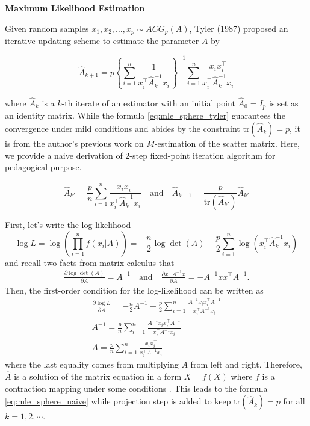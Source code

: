 \documentclass[fontsize=12pt]{article}
\begin{document}
\noindent\textbf{Maximum Likelihood Estimation}

Given random samples $x_1,x_2,\ldots,x_p \sim ACG_p(A)$, Tyler (1987) proposed an iterative updating scheme to estimate the parameter $A$ by
\begin{mdframed}
\begin{equation}\label{eq:mle_sphere_tyler}
	\hat{A}_{k+1} = p \left\lbrace
	\sum_{i=1}^{n} \frac{1}{x_i^\top \hat{A}_{k}^{-1} x_i}
	\right\rbrace^{-1} \sum_{i=1}^n \frac{x_i x_i^\top}{x_i^\top \hat{A}_{k}^{-1} x_i}
\end{equation}
\end{mdframed}
where $\hat{A}_k$ is a $k$-th iterate of an estimator with an initial point $\hat{A}_0 = I_{p}$ is set as an identity matrix. While the formula \eqref{eq:mle_sphere_tyler} guarantees the convergence under mild conditions and abides by the constraint $\text{tr}(\hat{A}_k) = p$, it is from the author's previous work on $M$-estimation of the scatter matrix. Here, we provide a naive derivation of 2-step fixed-point iteration algorithm for pedagogical purpose. 

\begin{mdframed}
	\begin{equation}\label{eq:mle_sphere_naive}
		\hat{A}_{k'} = \frac{p}{n} \sum_{i=1}^n \frac{x_i x_i^\top}{x_i^\top \hat{A}_{k}^{-1} x_i} \quad \text{and}\quad \hat{A}_{k+1} =  \frac{p}{\text{tr}(\hat{A}_{k'})} \hat{A}_{k'}
	\end{equation}
\end{mdframed}

\noindent First, let's write the log-likelihood
\begin{equation*}
	\log L = \log \left(\prod_{i=1}^{n} f(x_i\vert A)\right) = -\frac{n}{2} \log\det(A) - \frac{p}{2} \sum_{i=1}^n \log (x_i^\top \hat{A}_{k}^{-1} x_i)
\end{equation*}
and recall two facts from matrix calculus \cite{cookbook} that
\begin{gather*}
	\frac{\partial \log\det(A)}{\partial A} = A^{-1} \quad \text{and} \quad \frac{\partial x^\top A^{-1} x}{\partial A} = -A^{-1} xx^\top A^{-1}.
\end{gather*}
Then, the first-order condition for the log-likelihood can be written as
\begin{gather*}
	\frac{\partial \log L}{\partial A} = -\frac{n}{2} A^{-1} + \frac{p}{2} \sum_{i=1}^n \frac{A^{-1} x_i x_i^\top A^{-1}}{x_i^\top A^{-1} x_i} \\
	A^{-1} = \frac{p}{n} \sum_{i=1}^n \frac{A^{-1} x_i x_i^\top A^{-1}}{x_i^\top A^{-1} x_i} \\
	A = \frac{p}{n} \sum_{i=1}^n \frac{ x_i x_i^\top }{x_i^\top A^{-1} x_i}
\end{gather*}
where the last equality comes from multiplying $A$ from left and right. Therefore, $\hat{A}$ is a solution of the matrix equation in a form $X = f(X)$ where $f$ is a contraction mapping under some conditions \cite{tyler_statistical_1987}. This leads to the formula \eqref{eq:mle_sphere_naive} while projection step is added to keep $\text{tr}(\hat{A}_k) = p$ for all $k=1,2,\cdots$. 
\end{document}
